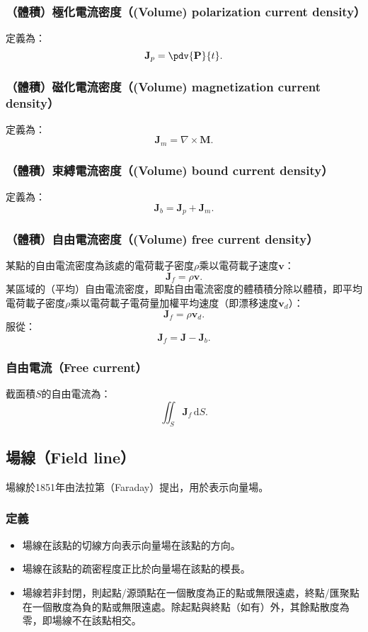 \documentclass[a4paper,12pt]{report}
\begin{document}
\begin{itemize}
\subsubsection{（體積）極化電流密度（(Volume) polarization current density）}
定義為：
\[\mathbf{J}_p=\pdv{\mathbf{P}}{t}.\]
\subsubsection{（體積）磁化電流密度（(Volume) magnetization current density）}
定義為：
\[\mathbf{J}_m=\nabla \times \mathbf{M}.\]
\subsubsection{（體積）束縛電流密度（(Volume) bound current density）}
定義為：
\[\mathbf{J}_b = \mathbf{J}_p + \mathbf{J}_m.\]
\subsubsection{（體積）自由電流密度（(Volume) free current density）}
某點的自由電流密度為該處的電荷載子密度$\rho$乘以電荷載子速度$\mathbf{v}$：
\[\mathbf{J}_f=\rho\mathbf{v}.\]
某區域的（平均）自由電流密度，即點自由電流密度的體積積分除以體積，即平均電荷載子密度$\rho$乘以電荷載子電荷量加權平均速度（即漂移速度$\mathbf{v}_d$）：
\[\mathbf{J}_f=\rho\mathbf{v}_d.\]
服從：
\[\mathbf{J}_f=\mathbf{J}-\mathbf{J}_b.\]
\subsubsection{自由電流（Free current）}
截面積$S$的自由電流為：
\[\iint_S\mathbf{J}_f\,\mathrm{d}S.\]
\subsection{場線（Field line）}
場線於1851年由法拉第（Faraday）提出，用於表示向量場。
\subsubsection{定義}
\begin{itemize}
\item 場線在該點的切線方向表示向量場在該點的方向。
\item 場線在該點的疏密程度正比於向量場在該點的模長。
\item 場線若非封閉，則起點/源頭點在一個散度為正的點或無限遠處，終點/匯聚點在一個散度為負的點或無限遠處。除起點與終點（如有）外，其餘點散度為零，即場線不在該點相交。
\end{itemize}

\end{itemize}
\end{document}
